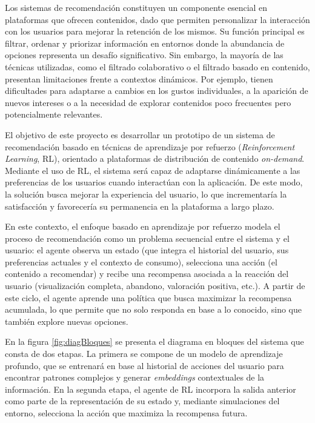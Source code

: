 \documentclass[
11pt, %
]{charter}
\begin{document}
Los sistemas de recomendación constituyen un componente esencial en plataformas que ofrecen contenidos, dado que permiten personalizar la interacción con los usuarios para mejorar la retención de los mismos. Su función principal es filtrar, ordenar y priorizar información en entornos donde la abundancia de opciones representa un desafío significativo. Sin embargo, la mayoría de las técnicas utilizadas, como el filtrado colaborativo o el filtrado basado en contenido, presentan limitaciones frente a contextos dinámicos. Por ejemplo, tienen dificultades para adaptarse a cambios en los gustos individuales, a la aparición de nuevos intereses o a la necesidad de explorar contenidos poco frecuentes pero potencialmente relevantes.

El objetivo de este proyecto es desarrollar un prototipo de un sistema de recomendación basado en técnicas de aprendizaje por refuerzo (\textit{Reinforcement Learning}, RL), orientado a plataformas de distribución de contenido \textit{on-demand}. Mediante el uso de RL, el sistema será capaz de adaptarse dinámicamente a las preferencias de los usuarios cuando interactúan con la aplicación. De este modo, la solución busca mejorar la experiencia del usuario, lo que incrementaría la satisfacción y favorecería su permanencia en la plataforma a largo plazo.

En este contexto, el enfoque basado en aprendizaje por refuerzo modela el proceso de recomendación como un problema secuencial entre el sistema y el usuario: el agente observa un estado (que integra el historial del usuario, sus preferencias actuales y el contexto de consumo), selecciona una acción (el contenido a recomendar) y recibe una recompensa asociada a la reacción del usuario (visualización completa, abandono, valoración positiva, etc.). A partir de este ciclo, el agente aprende una política que busca maximizar la recompensa acumulada, lo que permite que no solo responda en base a lo conocido, sino que también explore nuevas opciones.

En la figura \ref{fig:diagBloques} se presenta el diagrama en bloques del sistema que consta de dos etapas. La primera se compone de un modelo de aprendizaje profundo, que se entrenará en base al historial de acciones del usuario para encontrar patrones complejos y generar \textit{embeddings} contextuales de la información. En la segunda etapa, el agente de RL incorpora la salida anterior como parte de la representación de su estado y, mediante simulaciones del entorno, selecciona la acción que maximiza la recompensa futura.
\end{document}
